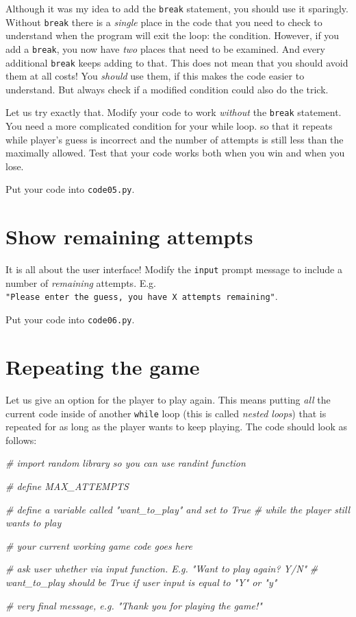 \documentclass[
]{book}
\newenvironment{Shaded}{\begin{snugshade}}{\end{snugshade}}
\newcommand{\CommentTok}[1]{\textcolor[rgb]{0.56,0.35,0.01}{\textit{#1}}}
\begin{document}
Although it was my idea to add the \texttt{break} statement, you should use it sparingly. Without \texttt{break} there is a \emph{single} place in the code that you need to check to understand when the program will exit the loop: the condition. However, if you add a \texttt{break}, you now have \emph{two} places that need to be examined. And every additional \texttt{break} keeps adding to that. This does not mean that you should avoid them at all costs! You \emph{should} use them, if this makes the code easier to understand. But always check if a modified condition could also do the trick.

Let us try exactly that. Modify your code to work \emph{without} the \texttt{break} statement. You need a more complicated condition for your while loop. so that it repeats while player's guess is incorrect and the number of attempts is still less than the maximally allowed. Test that your code works both when you win and when you lose.

Put your code into \texttt{code05.py}.

\hypertarget{show-remaining-attempts}{%
\section{Show remaining attempts}\label{show-remaining-attempts}}

It is all about the user interface! Modify the \texttt{input} prompt message to include a number of \emph{remaining} attempts. E.g. \texttt{"Please\ enter\ the\ guess,\ you\ have\ X\ attempts\ remaining"}.

Put your code into \texttt{code06.py}.

\hypertarget{guess-the-number-repeat-game}{%
\section{Repeating the game}\label{guess-the-number-repeat-game}}

Let us give an option for the player to play again. This means putting \emph{all} the current code inside of another \texttt{while} loop (this is called \emph{nested loops}) that is repeated for as long as the player wants to keep playing. The code should look as follows:

\begin{Shaded}
\begin{Highlighting}[]
\CommentTok{\# import random library so you can use randint function}

\CommentTok{\# define MAX\_ATTEMPTS}

\CommentTok{\# define a variable called "want\_to\_play" and set to True}
\CommentTok{\# while the player still wants to play}
  
  \CommentTok{\# your current working game code goes here}
  
  \CommentTok{\# ask user whether via input function. E.g. "Want to play again? Y/N"}
  \CommentTok{\# want\_to\_play should be True if user input is equal to "Y" or "y"}
  
\CommentTok{\# very final message, e.g. "Thank you for playing the game!"}
\end{Highlighting}
\end{Shaded}
\end{document}
